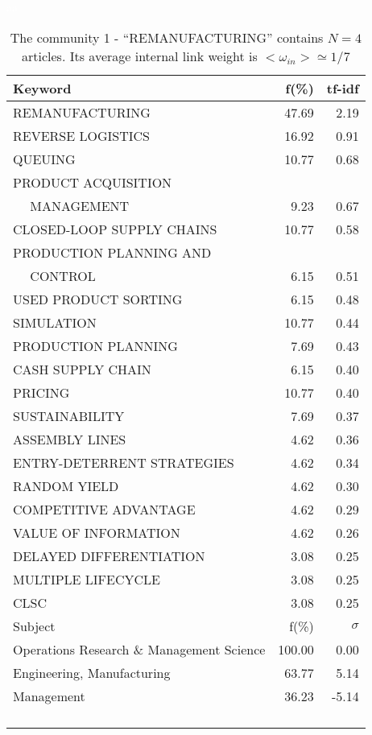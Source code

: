 \documentclass[a4paper,11pt]{report}
\begin{document}
\begin{landscape}
\clearpage

\begin{table}[!ht]
\caption{The community 1 - ``REMANUFACTURING'' contains $N = 4$ articles. Its average internal link weight is $<\omega_{in}> \simeq 1/7$ }
\textcolor{white}{aa}\\
{\scriptsize\begin{tabular}{|l r  r|}
\hline
Keyword & f(\%) & tf-idf \\
\hline
REMANUFACTURING & 47.69 & 2.19\\
REVERSE LOGISTICS & 16.92 & 0.91\\
QUEUING & 10.77 & 0.68\\
PRODUCT ACQUISITION &  &\\
$\quad$ MANAGEMENT & 9.23 & 0.67\\
CLOSED-LOOP SUPPLY CHAINS & 10.77 & 0.58\\
PRODUCTION PLANNING AND &  &\\
$\quad$ CONTROL & 6.15 & 0.51\\
USED PRODUCT SORTING & 6.15 & 0.48\\
SIMULATION & 10.77 & 0.44\\
PRODUCTION PLANNING & 7.69 & 0.43\\
CASH SUPPLY CHAIN & 6.15 & 0.40\\
PRICING & 10.77 & 0.40\\
SUSTAINABILITY & 7.69 & 0.37\\
ASSEMBLY LINES & 4.62 & 0.36\\
ENTRY-DETERRENT STRATEGIES & 4.62 & 0.34\\
RANDOM YIELD & 4.62 & 0.30\\
COMPETITIVE ADVANTAGE & 4.62 & 0.29\\
VALUE OF INFORMATION & 4.62 & 0.26\\
DELAYED DIFFERENTIATION & 3.08 & 0.25\\
MULTIPLE LIFECYCLE & 3.08 & 0.25\\
CLSC & 3.08 & 0.25\\
\hline
\hline
Subject & f(\%) & $\sigma$\\
\hline
Operations Research \& Management Science & 100.00 & 0.00\\
Engineering, Manufacturing & 63.77 & 5.14\\
Management & 36.23 & -5.14\\
 &  & \\
 &  & \\
 &  & \\
 &  & \\

\end{tabular}}
\end{table}
\end{landscape}
\end{document}
